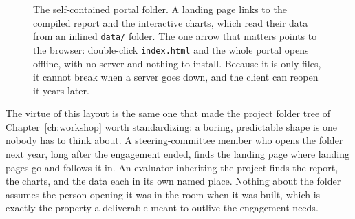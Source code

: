 \documentclass[
    a4paper,
    fontsize=10pt,
    twoside=true,
    numbers=noenddot,
]{kaobook}
\begin{document}
\begin{figure}[htbp]
\centering
{}
\caption[The self-contained portal folder]{The self-contained portal folder. A landing page links to the compiled report and the interactive charts, which read their data from an inlined \texttt{data/} folder. The one arrow that matters points to the browser: double-click \texttt{index.html} and the whole portal opens offline, with no server and nothing to install. Because it is only files, it cannot break when a server goes down, and the client can reopen it years later.}
\label{fig:portal}
\end{figure}

The virtue of this layout is the same one that made the project folder tree of Chapter~\ref{ch:workshop} worth standardizing: a boring, predictable shape is one nobody has to think about. A steering-committee member who opens the folder next year, long after the engagement ended, finds the landing page where landing pages go and follows it in. An evaluator inheriting the project finds the report, the charts, and the data each in its own named place. Nothing about the folder assumes the person opening it was in the room when it was built, which is exactly the property a deliverable meant to outlive the engagement needs.
\end{document}
